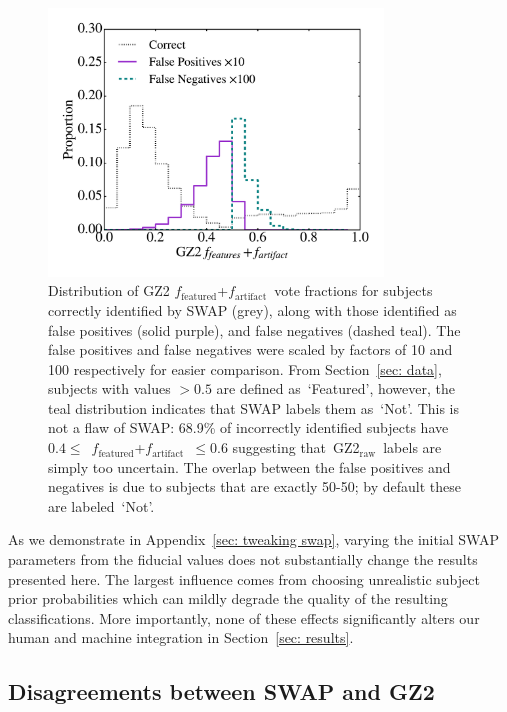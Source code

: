 \documentclass[twocolumn]{aastex6}
\newcommand{\feat}{`Featured'}
\newcommand{\notfeat}{`Not'}
\newcommand{\raw}{GZ2$_{\text{raw}}$}
\newcommand{\ffeat}{$f_{\mathrm{featured}}$}
\newcommand{\fstar}{$f_{\mathrm{artifact}}$}
\begin{document}
\begin{figure}[t!]
\includegraphics[width=3.5in]{figures/SWAP_GZ2_disagree.pdf}
\caption{Distribution of GZ2 \ffeat+\fstar~vote fractions for subjects correctly identified by SWAP (grey), along with those identified as false positives (solid purple), and false negatives (dashed teal). 
The false positives and false negatives were scaled by factors of 10 and 100 respectively for easier comparison. From Section~\ref{sec: data}, subjects with values $> 0.5$ are defined as~\feat, however, the teal distribution indicates that SWAP labels them as~\notfeat. This is not a flaw of SWAP: 68.9\% of incorrectly identified subjects have $0.4 \le $~\ffeat +\fstar~$ \le 0.6$ suggesting that~\raw~labels are simply too uncertain. The overlap between the false positives and negatives is due to subjects that are exactly 50-50; by default these are labeled~\notfeat. \label{fig: SWAP sucks}}
\end{figure}

As we demonstrate in Appendix~\ref{sec: tweaking swap}, varying the initial SWAP 
parameters from the fiducial values does not substantially change the results 
presented here. The largest influence comes from choosing unrealistic subject 
prior probabilities which can mildly degrade the quality of the resulting classifications. 
More importantly, none of these effects significantly alters our human and machine integration in Section~\ref{sec: results}. 



\subsection{Disagreements between SWAP and GZ2}
\end{document}

